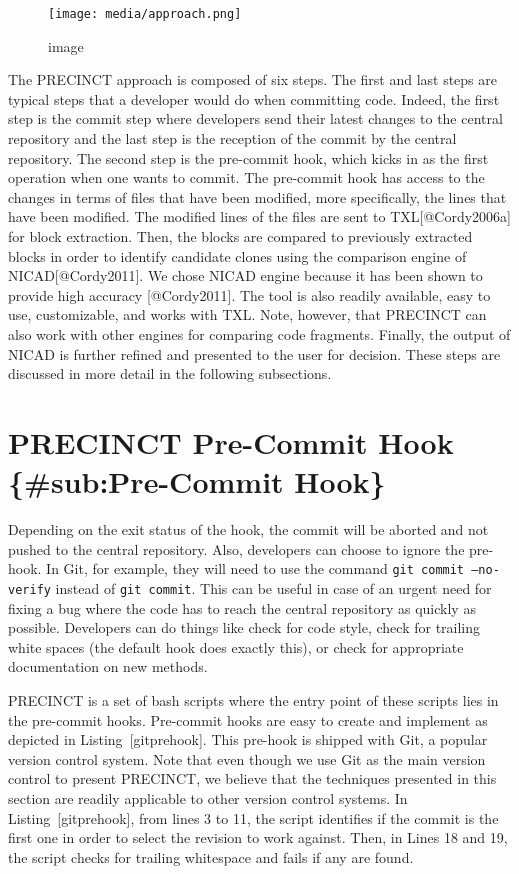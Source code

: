 \begin{figure}[htbp]
\centering
\texttt{[image: media/approach.png]}
\caption{image}
\end{figure}

The PRECINCT approach is composed of six steps. The first and last steps
are typical steps that a developer would do when committing code.
Indeed, the first step is the commit step where developers send their
latest changes to the central repository and the last step is the
reception of the commit by the central repository. The second step is
the pre-commit hook, which kicks in as the first operation when one
wants to commit. The pre-commit hook has access to the changes in terms
of files that have been modified, more specifically, the lines that have
been modified. The modified lines of the files are sent to
TXL{[}@Cordy2006a{]} for block extraction. Then, the blocks are compared
to previously extracted blocks in order to identify candidate clones
using the comparison engine of NICAD{[}@Cordy2011{]}. We chose NICAD
engine because it has been shown to provide high accuracy
{[}@Cordy2011{]}. The tool is also readily available, easy to use,
customizable, and works with TXL. Note, however, that PRECINCT can also
work with other engines for comparing code fragments. Finally, the
output of NICAD is further refined and presented to the user for
decision. These steps are discussed in more detail in the following
subsections.

\section{PRECINCT Pre-Commit Hook \{\#sub:Pre-Commit
Hook\}}\label{precinct-pre-commit-hook-subpre-commit-hook}

Depending on the exit status of the hook, the commit will be aborted and
not pushed to the central repository. Also, developers can choose to
ignore the pre-hook. In Git, for example, they will need to use the
command \texttt{git\ commit\ –no-verify} instead of
\texttt{git\ commit}. This can be useful in case of an urgent need for
fixing a bug where the code has to reach the central repository as
quickly as possible. Developers can do things like check for code style,
check for trailing white spaces (the default hook does exactly this), or
check for appropriate documentation on new methods.

PRECINCT is a set of bash scripts where the entry point of these scripts
lies in the pre-commit hooks. Pre-commit hooks are easy to create and
implement as depicted in Listing~{[}gitprehook{]}. This pre-hook is
shipped with Git, a popular version control system. Note that even
though we use Git as the main version control to present PRECINCT, we
believe that the techniques presented in this section are readily
applicable to other version control systems. In
Listing~{[}gitprehook{]}, from lines 3 to 11, the script identifies if
the commit is the first one in order to select the revision to work
against. Then, in Lines 18 and 19, the script checks for trailing
whitespace and fails if any are found.

